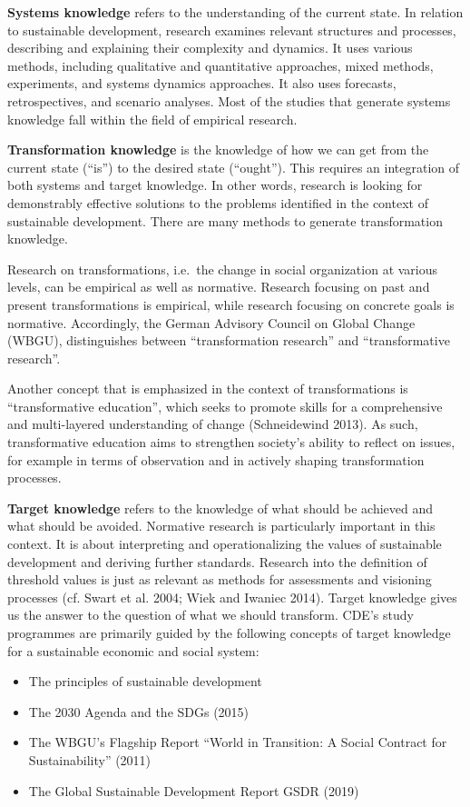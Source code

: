 \documentclass[
  a4paper,
  DIV=11,
  numbers=noendperiod,
  oneside,
  openany]{scrreprt}
\providecommand{\tightlist}{%
  \setlength{\itemsep}{0pt}\setlength{\parskip}{0pt}}
\begin{document}
\textbf{Systems knowledge} refers to the understanding of the current
state. In relation to sustainable development, research examines
relevant structures and processes, describing and explaining their
complexity and dynamics. It uses various methods, including qualitative
and quantitative approaches, mixed methods, experiments, and systems
dynamics approaches. It also uses forecasts, retrospectives, and
scenario analyses. Most of the studies that generate systems knowledge
fall within the field of empirical research.

\textbf{Transformation knowledge} is the knowledge of how we can get
from the current state (``is'') to the desired state (``ought''). This
requires an integration of both systems and target knowledge. In other
words, research is looking for demonstrably effective solutions to the
problems identified in the context of sustainable development. There are
many methods to generate transformation knowledge.

Research on transformations, i.e.~the change in social organization at
various levels, can be empirical as well as normative. Research focusing
on past and present transformations is empirical, while research
focusing on concrete goals is normative. Accordingly, the German
Advisory Council on Global Change (WBGU), distinguishes between
``transformation research'' and ``transformative research''.

Another concept that is emphasized in the context of transformations is
``transformative education'', which seeks to promote skills for a
comprehensive and multi-layered understanding of change (Schneidewind
2013). As such, transformative education aims to strengthen society's
ability to reflect on issues, for example in terms of observation and in
actively shaping transformation processes.

\textbf{Target knowledge} refers to the knowledge of what should be
achieved and what should be avoided. Normative research is particularly
important in this context. It is about interpreting and operationalizing
the values of sustainable development and deriving further standards.
Research into the definition of threshold values is just as relevant as
methods for assessments and visioning processes (cf. Swart et al. 2004;
Wiek and Iwaniec 2014). Target knowledge gives us the answer to the
question of what we should transform. CDE's study programmes are
primarily guided by the following concepts of target knowledge for a
sustainable economic and social system:

\begin{itemize}
\tightlist
\item
  The principles of sustainable development
\item
  The 2030 Agenda and the SDGs (2015)
\item
  The WBGU's Flagship Report ``World in Transition: A Social Contract
  for Sustainability'' (2011)
\item
  The Global Sustainable Development Report GSDR (2019)
\end{itemize}
\end{document}
